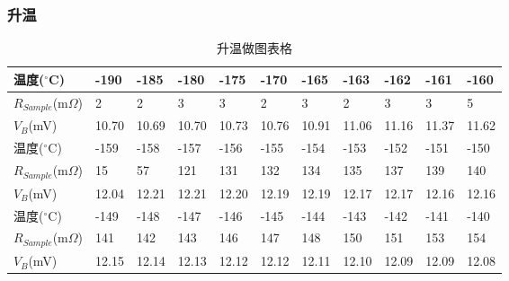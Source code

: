 \documentclass[UTF8]{ctexart}
\begin{document}
    \subsubsection{升温}

    \begin{table}[H]
        \centering
        \begin{tabular}{|l|l|l|l|l|l|l|l|l|l|l|}
        \hline
            温度($^{\circ}$C) & -190 & -185 & -180 & -175 & -170 & -165 & -163 & -162 & -161 & -160 \\ \hline
            $R_{Sample}$(m$\Omega$) & 2 & 2 & 3 & 3 & 2 & 3 & 2 & 3 & 3 & 5 \\ \hline
            $V_B$(mV) & 10.70 & 10.69 & 10.70 & 10.73 & 10.76 & 10.91 & 11.06 & 11.16 & 11.37 & 11.62 \\ \hline
            \hline
            温度($^{\circ}$C) & -159 & -158 & -157 & -156 & -155 & -154 & -153 & -152 & -151 & -150 \\ \hline
            $R_{Sample}$(m$\Omega$) & 15 & 57 & 121 & 131 & 132 & 134 & 135 & 137 & 139 & 140 \\ \hline
            $V_B$(mV) & 12.04 & 12.21 & 12.21 & 12.20 & 12.19 & 12.19 & 12.17 & 12.17 & 12.16 & 12.16 \\ \hline
            \hline
            温度($^{\circ}$C) & -149 & -148 & -147 & -146 & -145 & -144 & -143 & -142 & -141 & -140 \\ \hline
            $R_{Sample}$(m$\Omega$) & 141 & 142 & 143 & 146 & 147 & 148 & 150 & 151 & 153 & 154 \\ \hline
            $V_B$(mV) & 12.15 & 12.14 & 12.13 & 12.12 & 12.12 & 12.11 & 12.10 & 12.09 & 12.09 & 12.08 \\ \hline
        \end{tabular}
        \caption{升温做图表格} %
        \label{升温做图表格} %
    \end{table}

\end{document}
